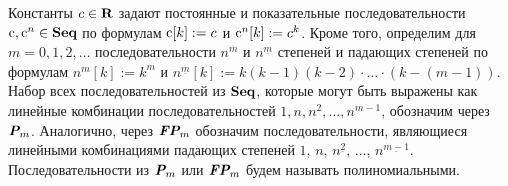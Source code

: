 Константы $c \in \text{\bfseries R}$ задают постоянные и показательные последовательности ${\rm c}, {\rm c}^n \in \text{\bfseries Seq}$ по формулам ${\rm c}[k] := c$ и ${\rm c}^n[k] := c^k$. Кроме того, определим для $m = 0,1,2,\ldots$ последовательности $n^m$ и $n^{\underline{m}}$ степеней и падающих степеней по формулам $n^m[k] := k^m$ и $n^{\underline{m}}[k] := k(k-1)(k-2)\cdot \ldots \cdot (k-(m-1)).$ Набор всех последовательностей из $\text{\bfseries Seq}$, которые могут быть выражены как линейные комбинации последовательностей $1, n, n^2, \ldots, n^{m-1}$, обозначим через $\text{\bfseries\itshape P}_m$. Аналогично, через $\text{\bfseries\itshape FP}_m$ обозначим последовательности, являющиеся линейными комбинациями падающих степеней $1$, $n$, $n^{\underline{2}}$, $\ldots$, $n^{\underline{m-1}}$. Последовательности из $\text{\bfseries\itshape P}_m$ или $\text{\bfseries\itshape FP}_m$ будем называть полиномиальными.
